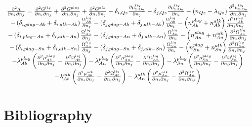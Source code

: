 \documentclass[11pt, titlepage, twoside]{article}
\begin{document}
\begin{MPEquation}[!ht]
\begin{equation}
\begin{array}{c}
\frac{{{\partial ^2}\Lambda }}{{\partial {n_i}\partial {n_j}}} = \frac{{{\partial ^2}{G^{liq}}}}{{\partial {n_i}\partial {n_j}}} + \frac{{{\partial ^2}{G^{plag}}}}{{\partial {n_i}\partial {n_j}}} + \frac{{{\partial ^2}{G^{alk}}}}{{\partial {n_i}\partial {n_j}}} - {\delta _{i,Qz}}\frac{{\partial \mu _{{\rm{Si}}{{\rm{O}}_2}}^{liq}}}{{\partial {n_j}}} - {\delta _{j,Qz}}\frac{{\partial \mu _{{\rm{Si}}{{\rm{O}}_2}}^{liq}}}{{\partial {n_i}}} - \left( {{n_{Qz}} - {\lambda _{Qz}}} \right)\frac{{{\partial ^2}\mu _{{\rm{Si}}{{\rm{O}}_2}}^{liq}}}{{\partial {n_i}\partial {n_j}}}\\
 - \left( {{\delta _{i,plag - Ab}} + {\delta _{i,alk - Ab}}} \right)\frac{{\Omega _{Ab}^{liq}}}{{\partial {n_j}}} - \left( {{\delta _{j,plag - Ab}} + {\delta _{j,alk - Ab}}} \right)\frac{{\Omega _{Ab}^{liq}}}{{\partial {n_i}}} - \left( {n_{Ab}^{plag} + n_{Ab}^{alk}} \right)\frac{{{\partial ^2}\Omega _{Ab}^{liq}}}{{\partial {n_i}\partial {n_j}}}\\
 - \left( {{\delta _{i,plag - An}} + {\delta _{i,alk - An}}} \right)\frac{{\Omega _{An}^{liq}}}{{\partial {n_j}}} - \left( {{\delta _{j,plag - An}} + {\delta _{j,alk - An}}} \right)\frac{{\Omega _{An}^{liq}}}{{\partial {n_i}}} - \left( {n_{An}^{plag} + n_{An}^{alk}} \right)\frac{{{\partial ^2}\Omega _{An}^{liq}}}{{\partial {n_i}\partial {n_j}}}\\
 - \left( {{\delta _{i,plag - Sn}} + {\delta _{i,alk - Sn}}} \right)\frac{{\Omega _{Sn}^{liq}}}{{\partial {n_j}}} - \left( {{\delta _{j,plag - Sn}} + {\delta _{j,alk - Sn}}} \right)\frac{{\Omega _{Sn}^{liq}}}{{\partial {n_i}}} - \left( {n_{Sn}^{plag} + n_{Sn}^{alk}} \right)\frac{{{\partial ^2}\Omega _{Sn}^{liq}}}{{\partial {n_i}\partial {n_j}}}\\
 - \lambda _{Ab}^{plag}\left( {\frac{{{\partial ^2}\mu _{Ab}^{plag}}}{{\partial {n_i}\partial {n_j}}} - \frac{{{\partial ^2}\Omega _{Ab}^{liq}}}{{\partial {n_i}\partial {n_j}}}} \right) - \lambda _{An}^{plag}\left( {\frac{{{\partial ^2}\mu _{An}^{plag}}}{{\partial {n_i}\partial {n_j}}} - \frac{{{\partial ^2}\Omega _{An}^{liq}}}{{\partial {n_i}\partial {n_j}}}} \right) - \lambda _{Sn}^{plag}\left( {\frac{{{\partial ^2}\mu _{Sn}^{plag}}}{{\partial {n_i}\partial {n_j}}} - \frac{{{\partial ^2}\Omega _{Sn}^{liq}}}{{\partial {n_i}\partial {n_j}}}} \right)\\
 - \lambda _{Ab}^{alk}\left( {\frac{{{\partial ^2}\mu _{Ab}^{alk}}}{{\partial {n_i}\partial {n_j}}} - \frac{{{\partial ^2}\Omega _{Ab}^{liq}}}{{\partial {n_i}\partial {n_j}}}} \right) - \lambda _{An}^{alk}\left( {\frac{{{\partial ^2}\mu _{An}^{alk}}}{{\partial {n_i}\partial {n_j}}} - \frac{{{\partial ^2}\Omega _{An}^{liq}}}{{\partial {n_i}\partial {n_j}}}} \right)
\end{array}
\end{equation}
\label{MPEquationElement:7058114C-DC63-4498-B92D-5B9E49C39A69}
\end{MPEquation}



\section{Bibliography}\label{MPSection:DD6D405C-05BC-482E-DC3F-62C9120E8FE3}

\printbibliography[heading=none]
\end{document}
